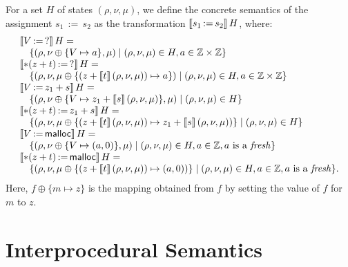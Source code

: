 For a set $H$ of states $(\rho,\nu,\mu)$, we define the concrete semantics of the assignment
$s_1\,{:=}\,s_2$ as the transformation
$\llbracket s_1\,{:=}\,s_2\rrbracket\,H$, where:
\[
    \begin{array}{l}
        \llbracket V\,{:=}\,?\rrbracket\,H =
        \\
        \quad \{(\rho,\nu\oplus\{V\mapsto a\},\mu)\mid(\rho,\nu,\mu)\in H,a\in\mathbb{Z} \times \mathbb{Z}\}                   \\
        \llbracket*(z+t)\,{:=}\,?\rrbracket\,H =                                                                    \\
        \quad \{(\rho,\nu,\mu\oplus\{(z+\llbracket t\rrbracket\,(\rho,\nu,\mu))\mapsto a\})
        \mid(\rho,\nu,\mu)\in H,a\in\mathbb{Z} \times \mathbb{Z}\}                                                             \\
        \llbracket V\,{:=}\,z_1+s\rrbracket\,H =                                                                     \\
        \quad \{(\rho,\nu\oplus\{V\mapsto z_1+\llbracket s\rrbracket\,(\rho,\nu,\mu)\},\mu)\mid(\rho,\nu,\mu)\in H\} \\
        \llbracket*(z+t)\,{:=}\,z_1+s\rrbracket\,H =                                                                \\
        \quad \{(\rho,\nu,\mu\oplus\{(z+\llbracket t\rrbracket\,(\rho,\nu,\mu))\mapsto z_1+\llbracket s\rrbracket\,(\rho,\nu,\mu))\}
        \mid(\rho,\nu,\mu)\in H\}                                                                     \\
        \llbracket V\,{:=}\,\textsf{malloc}\rrbracket\,H =                                                                   \\
        \quad \{(\rho,\nu\oplus\{V\mapsto (a,0)\},\mu)\mid
        (\rho,\nu,\mu)\in H, a\in \mathbb{Z},
        a \text{ is a \emph{fresh}}\}                                                                 \\
        \llbracket*(z+t)\,{:=}\,\textsf{malloc}\rrbracket\,H =
        \\
        \quad\{(\rho,\nu,\mu\oplus\{(z+\llbracket t\rrbracket\,(\rho,\nu,\mu))\mapsto (a,0))\}\mid
        (\rho,\nu,\mu)\in H, a\in \mathbb{Z}, a \text{ is a \emph{fresh}}\}.
    \end{array}
\]
Here,
$f\oplus\{m\mapsto z\}$ is the mapping obtained
from $f$ by
setting the value of $f$ for $m$ to $z$.

\section{Interprocedural Semantics}

